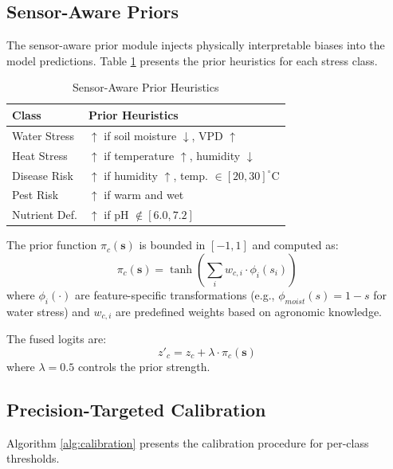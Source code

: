 \documentclass[10pt,journal,compsoc]{IEEEtran}
\begin{document}
\subsection{Sensor-Aware Priors}

The sensor-aware prior module injects physically interpretable biases into the model predictions. Table \ref{tab:sensor_priors} presents the prior heuristics for each stress class.

\begin{table}[!t]
\centering
\caption{Sensor-Aware Prior Heuristics}
\label{tab:sensor_priors}
\small
\begin{tabular}{ll}
\toprule
\textbf{Class} & \textbf{Prior Heuristics} \\
\midrule
Water Stress & $\uparrow$ if soil moisture $\downarrow$, VPD $\uparrow$ \\
Heat Stress & $\uparrow$ if temperature $\uparrow$, humidity $\downarrow$ \\
Disease Risk & $\uparrow$ if humidity $\uparrow$, temp. $\in [20, 30]^\circ$C \\
Pest Risk & $\uparrow$ if warm and wet \\
Nutrient Def. & $\uparrow$ if pH $\notin [6.0, 7.2]$ \\
\bottomrule
\end{tabular}
\end{table}

The prior function $\pi_c(\mathbf{s})$ is bounded in $[-1, 1]$ and computed as:
\begin{equation}
    \pi_c(\mathbf{s}) = \tanh\left(\sum_{i} w_{c,i} \cdot \phi_i(s_i)\right)
\end{equation}
where $\phi_i(\cdot)$ are feature-specific transformations (e.g., $\phi_{moist}(s) = 1 - s$ for water stress) and $w_{c,i}$ are predefined weights based on agronomic knowledge.

The fused logits are:
\begin{equation}
    z'_c = z_c + \lambda \cdot \pi_c(\mathbf{s})
\end{equation}
where $\lambda = 0.5$ controls the prior strength.

\subsection{Precision-Targeted Calibration}

Algorithm \ref{alg:calibration} presents the calibration procedure for per-class thresholds.
\end{document}
